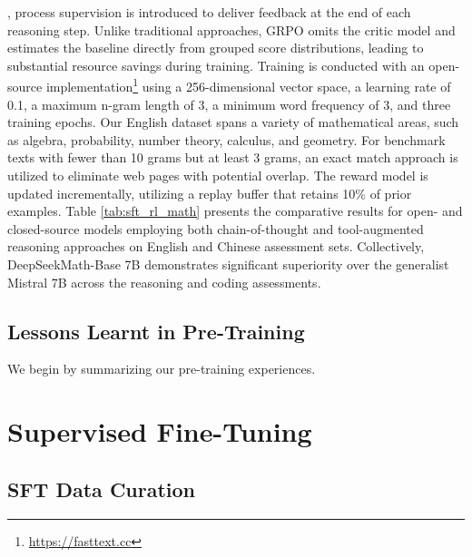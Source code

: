 \cite{wang2023math}, process supervision is introduced to deliver feedback at the end of each reasoning step. Unlike traditional approaches, GRPO omits the critic model and estimates the baseline directly from grouped score distributions, leading to substantial resource savings during training. Training is conducted with an open-source implementation\footnote{\url{https://fasttext.cc}} using a 256-dimensional vector space, a learning rate of 0.1, a maximum n-gram length of 3, a minimum word frequency of 3, and three training epochs. Our English dataset spans a variety of mathematical areas, such as algebra, probability, number theory, calculus, and geometry. For benchmark texts with fewer than 10 grams but at least 3 grams, an exact match approach is utilized to eliminate web pages with potential overlap. The reward model is updated incrementally, utilizing a replay buffer that retains 10\% of prior examples. Table \ref{tab:sft_rl_math} presents the comparative results for open- and closed-source models employing both chain-of-thought and tool-augmented reasoning approaches on English and Chinese assessment sets. Collectively, DeepSeekMath-Base 7B demonstrates significant superiority over the generalist Mistral 7B \citep{mistral} across the reasoning and coding assessments. \subsection{Lessons Learnt in Pre-Training}

We begin by summarizing our pre-training experiences. \section{Supervised Fine-Tuning}

\subsection{SFT Data Curation}

